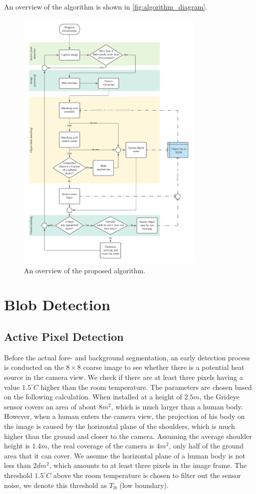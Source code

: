 An overview of the algorithm is shown in \autoref{fig:algorithm_diagram}.
\begin{figure}
  \centering
  \includegraphics[width=0.8\textwidth]{figures/Program_block_diagram.png}
  \caption{An overview of the proposed algorithm.}\label{fig:algorithm_diagram}
\end{figure}

\section{Blob Detection} \label{sec:detect}
\subsection{Active Pixel Detection}
Before the actual fore- and background segmentation, an early detection process is conducted on the $8\times8$ coarse image to see whether there is a potential heat source in the camera view. We check if there are at least three pixels having a value $1.5^\circ C$ higher than the room temperature. The parameters are chosen based on the following calculation. When installed at a height of $2.5m$, the Grideye sensor covers an area of about $8m^2$, which is much larger than a human body. However, when a human enters the camera view, the projection of his body on the image is caused by the horizontal plane of the shoulders, which is much higher than the ground and closer to the camera. Assuming the average shoulder height is $1.4m$, the real coverage of the camera is $4m^2$, only half of the ground area that it can cover. We assume the horizontal plane of a human body is not less than $2dm^2$, which amounts to at least three pixels in the image frame. The threshold $1.5^\circ C$ above the room temperature is chosen to filter out the sensor noise, we denote this threshold as $T_{lb}$ (low boundary).
